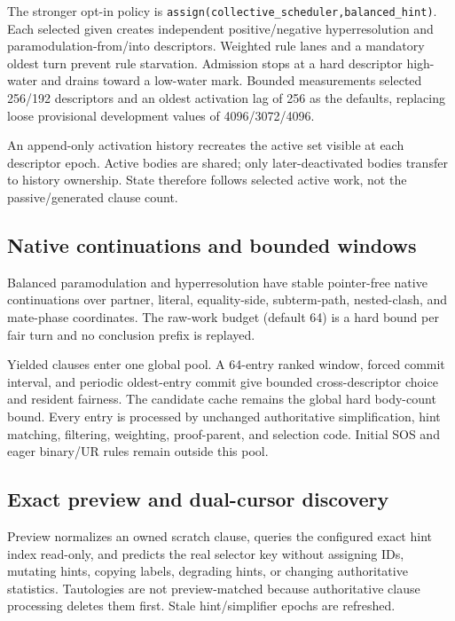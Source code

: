 \documentclass[11pt]{article}
\newcommand{\setting}[1]{\texttt{#1}}
\begin{document}
The stronger opt-in policy is
\setting{assign(collective\_scheduler,balanced\_hint)}.  Each selected given
creates independent positive/negative hyperresolution and
paramodulation-from/into descriptors.  Weighted rule lanes and a mandatory
oldest turn prevent rule starvation.  Admission stops at a hard descriptor
high-water and drains toward a low-water mark.  Bounded measurements selected
256/192 descriptors and an oldest activation lag of 256 as the defaults,
replacing loose provisional development values of 4096/3072/4096.

An append-only activation history recreates the active set visible at each
descriptor epoch.  Active bodies are shared; only later-deactivated bodies
transfer to history ownership.  State therefore follows selected active work,
not the passive/generated clause count.

\subsection{Native continuations and bounded windows}

Balanced paramodulation and hyperresolution have stable pointer-free native
continuations over partner, literal, equality-side, subterm-path, nested-clash,
and mate-phase coordinates.  The raw-work budget (default 64) is a hard bound
per fair turn and no conclusion prefix is replayed.

Yielded clauses enter one global pool.  A 64-entry ranked window, forced
commit interval, and periodic oldest-entry commit give bounded cross-descriptor
choice and resident fairness.  The candidate cache remains the global hard
body-count bound.  Every entry is processed by unchanged authoritative
simplification, hint matching, filtering, weighting, proof-parent, and
selection code.  Initial SOS and eager binary/UR rules remain outside this
pool.

\subsection{Exact preview and dual-cursor discovery}

Preview normalizes an owned scratch clause, queries the configured exact hint
index read-only, and predicts the real selector key without assigning IDs,
mutating hints, copying labels, degrading hints, or changing authoritative
statistics.  Tautologies are not preview-matched because authoritative clause
processing deletes them first.  Stale hint/simplifier epochs are refreshed.
\end{document}
